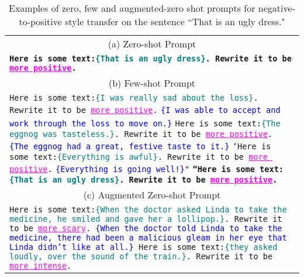 \newcommand{\inputsent}[1]{\textcolor{teal}{\{#1\}}}
\newcommand{\rewrite}[1]{{\textcolor{magenta}{\underline{#1}}}}
\newcommand{\outputsent}[1]{\textcolor{blue}{\{#1\}}}

\begin{table*}[t]
    \caption{Examples of zero, few and augmented-zero shot prompts for negative-to-positive style transfer on the sentence ``That is an ugly dress."
    }
    \label{tab:prompts}
    \centering
    \small
    \begin{tabular}{p{\linewidth}}
\hline
\multicolumn{1}{c}{(a) Zero-shot Prompt} \\
\textbf{\texttt{Here is some text:\inputsent{That is an ugly dress}. Rewrite it to be \rewrite{more positive}.}}
\\
\hline
\multicolumn{1}{c}{(b) Few-shot Prompt}\\
\texttt{Here is some text:\inputsent{I was really sad about the loss}. Rewrite it to be \rewrite{more positive}.}
\newline
\texttt{\outputsent{I was able to accept and work through the loss to move on.}}
\newline
\texttt{Here is some text:\inputsent{The eggnog was tasteless.}. Rewrite it to be \rewrite{more positive}.}
\newline
\texttt{\outputsent{The eggnog had a great, festive taste to it.}}
\newline
\texttt{`Here is some text:\inputsent{Everything is awful}. Rewrite it to be \rewrite{more positive}.}
\newline
\texttt{\outputsent{Everything is going well!}"}\newline
\textbf{\texttt{``Here is some text:\inputsent{That is an ugly dress}. Rewrite it to be \rewrite{more positive}.}}
\\
\hline
\multicolumn{1}{c}{(c) Augmented Zero-shot Prompt}
\\
\texttt{Here is some text:\inputsent{When the doctor asked Linda to take the medicine, he smiled and gave her a lollipop.}. Rewrite it to be \rewrite{more scary}. \newline
\outputsent{When the doctor told Linda to take the medicine, there had been a malicious gleam in her eye that Linda didn't like at all.} \newline
Here is some text:\inputsent{they asked loudly, over the sound of the train.}. Rewrite it to be \rewrite{more intense}. \newline
}
\end{tabular}
\end{table*}
